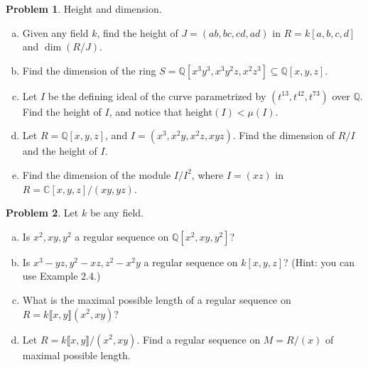 \documentclass[11pt]{article}
\theoremstyle{definition}
\newtheorem{problem}{Problem}
\begin{document}
\begin{problem}
Height and dimension.
	\begin{enumerate}[a)]
		\item Given any field $k$, find the height of $J = (ab,bc,cd,ad)$ in $R = k[a,b,c,d]$ and $\dim(R/J)$.
		\item Find the dimension of the ring $S = \mathbb{Q}[x^3y^3, x^3y^2z, x^2z^3] \subseteq \mathbb{Q}[x,y,z]$.
		\item Let $I$ be the defining ideal of the curve parametrized by $(t^{13},t^{42},t^{73})$ over $\mathbb{Q}$. Find the height of $I$, and notice that $\textrm{height}(I) < \mu(I)$.
		\item Let $R=\mathbb{Q}[x,y,z]$, and $I=(x^3, x^2y, x^2z, xyz)$. Find the dimension of $R/I$ and the height of $I$.
		\item Find the dimension of the module $I/I^2$, where $I = (xz)$ in $R = \mathbb{C}[x,y,z]/(xy,yz)$.	
	\end{enumerate}
\end{problem}


\begin{problem}
	Let $k$ be any field. 
	\begin{enumerate}[a)]
		\item Is $x^2, xy, y^2$ a regular sequence on $\mathbb{Q}[x^2,xy,y^2]$?
		\item Is $x^3-yz, y^2-xz, z^2-x^2y$ a regular sequence on $k[x,y,z]$? (Hint: you can use Example 2.4.)
		\item What is the maximal possible length of a regular sequence on $R = k \llbracket x,y \rrbracket (x^2,xy)$?
		\item Let $R = k \llbracket x,y \rrbracket/(x^2,xy)$. Find a regular sequence on $M = R/(x)$ of maximal possible length.
	\end{enumerate}
\end{problem}
\end{document}
